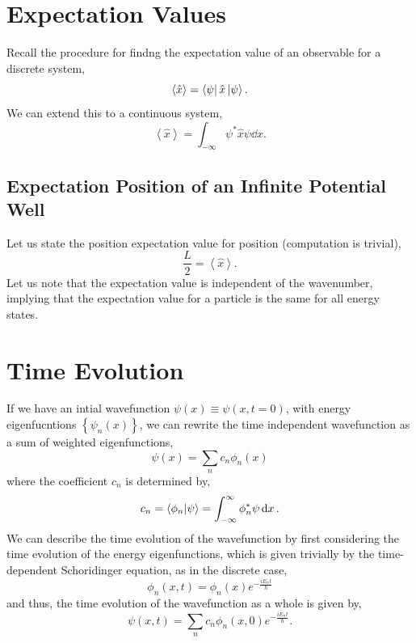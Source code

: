 \documentclass{book}
\begin{document}
\section{Expectation Values}
Recall the procedure for findng the expectation value of an observable for a discrete system,
\begin{equation}
	\left<\hat{x}\right> = \bra{\psi}\hat{x}\ket{\psi}.
\end{equation}
We can extend this to a continuous system,
\begin{equation}
	\boxed{\left<\hat{x}\right> = \int_{-\infty} \psi^*\hat{x}\psi \dd{x}}.
\end{equation}
\subsection{Expectation Position of an Infinite Potential Well}
Let us state the position expectation value for position (computation is trivial),
\begin{equation}
	\frac{L}{2} = \left<\hat{x}\right>.
\end{equation}
Let us note that the expectation value is independent of the wavenumber, implying that the expectation value for a particle is the same for all energy states.
\section{Time Evolution}
If we have an intial wavefunction $\psi(x) \equiv \psi(x,t=0)$, with energy eigenfucntions $\left\{\psi_n(x)\right\}$, we can rewrite the time independent wavefunction as a sum of weighted eigenfunctions,
\begin{equation}
	\psi(x) = \sum_n c_n \phi_n(x)
\end{equation}
where the coefficient $c_n$ is determined by,
\begin{equation}
	c_n = \braket{\phi_n}{\psi} = \int_{-\infty}^{\infty} \phi_n^*\psi\dd{x}.
\end{equation}
We can describe the time evolution of the wavefunction by first considering the time evolution of the energy eigenfunctions, which is given trivially by the time-dependent Schoridinger equation, as in the discrete case,
\begin{equation}
	\phi_n(x,t) = \phi_n(x)e^{-\frac{iE_nt}{\hbar}}
\end{equation}
and thus, the time evolution of the wavefunction as a whole is given by,
\begin{equation}
	\psi(x,t) = \sum_n c_n \phi_n(x,0)e^{-\frac{iE_nt}{\hbar}}.
\end{equation}
\end{document}
